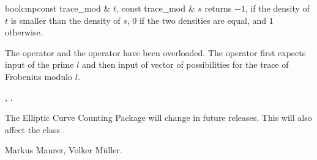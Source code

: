 \begin{fcode}{bool}{cmp}{const trace_mod & $t$, const trace_mod & $s$}
  returns $-1$, if the density of $t$ is smaller than the density of $s$, $0$ if the two
  densities are equal, and $1$ otherwise.
\end{fcode}



\IO

The  operator \code{<<} and the  operator \code{>>} have been
overloaded.  The  operator first expects input of the prime $l$ and then input of
vector of possibilities for the trace of Frobenius modulo $l$.



\SEEALSO

, .



\NOTES

The Elliptic Curve Counting Package will change in future releases.  This will also affect the
class .



\AUTHOR

Markus Maurer, Volker M\"uller.

